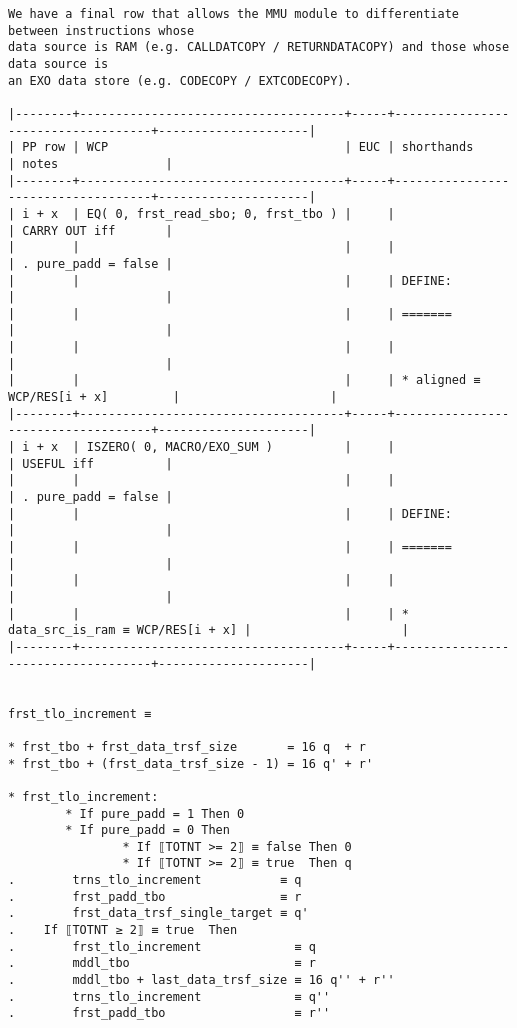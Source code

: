 \documentclass[varwidth=\maxdimen,margin=0.5cm,multi={verbatim}]{standalone}
\begin{document}
\begin{verbatim}
We have a final row that allows the MMU module to differentiate between instructions whose
data source is RAM (e.g. CALLDATCOPY / RETURNDATACOPY) and those whose data source is
an EXO data store (e.g. CODECOPY / EXTCODECOPY).

|--------+-------------------------------------+-----+------------------------------------+---------------------|
| PP row | WCP                                 | EUC | shorthands                         | notes               |
|--------+-------------------------------------+-----+------------------------------------+---------------------|
| i + x  | EQ( 0, frst_read_sbo; 0, frst_tbo ) |     |                                    | CARRY OUT iff       |
|        |                                     |     |                                    | . pure_padd = false |
|        |                                     |     | DEFINE:                            |                     |
|        |                                     |     | =======                            |                     |
|        |                                     |     |                                    |                     |
|        |                                     |     | * aligned ≡ WCP/RES[i + x]         |                     |
|--------+-------------------------------------+-----+------------------------------------+---------------------|
| i + x  | ISZERO( 0, MACRO/EXO_SUM )          |     |                                    | USEFUL iff          |
|        |                                     |     |                                    | . pure_padd = false |
|        |                                     |     | DEFINE:                            |                     |
|        |                                     |     | =======                            |                     |
|        |                                     |     |                                    |                     |
|        |                                     |     | * data_src_is_ram ≡ WCP/RES[i + x] |                     |
|--------+-------------------------------------+-----+------------------------------------+---------------------|


frst_tlo_increment ≡

* frst_tbo + frst_data_trsf_size       = 16 q  + r
* frst_tbo + (frst_data_trsf_size - 1) = 16 q' + r'

* frst_tlo_increment:
        * If pure_padd = 1 Then 0
        * If pure_padd = 0 Then
                * If ⟦TOTNT >= 2⟧ ≡ false Then 0
                * If ⟦TOTNT >= 2⟧ ≡ true  Then q
.        trns_tlo_increment           ≡ q
.        frst_padd_tbo                ≡ r
.        frst_data_trsf_single_target ≡ q'
.    If ⟦TOTNT ≥ 2⟧ ≡ true  Then
.        frst_tlo_increment             ≡ q
.        mddl_tbo                       ≡ r
.        mddl_tbo + last_data_trsf_size ≡ 16 q'' + r''
.        trns_tlo_increment             ≡ q''
.        frst_padd_tbo                  ≡ r''
\end{verbatim}
\end{document}
